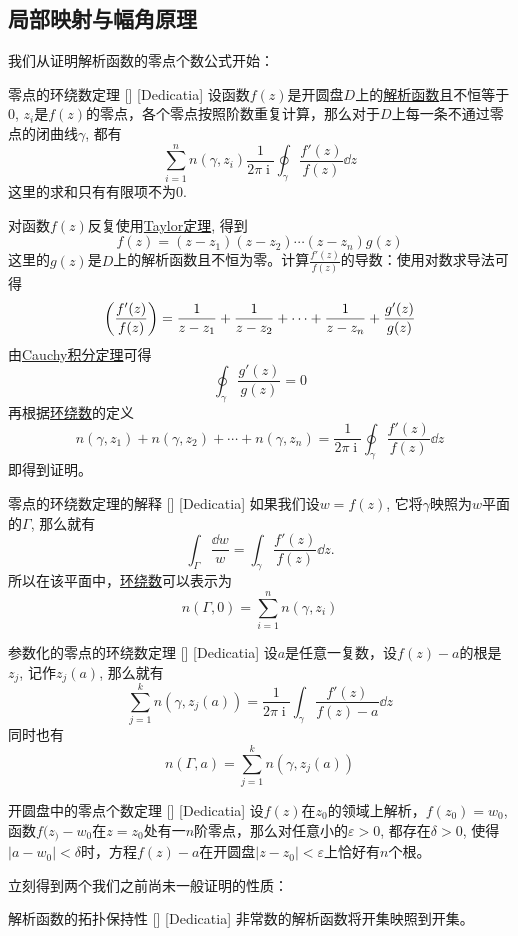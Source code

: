 \documentclass[UTF8]{ctexart}
\DeclareMathOperator{\ii}{\mathrm{i}}
\newcommand{\AnalyticalFunction}{\hyperref[dfn:AnalyticalFunction]{解析函数}}
\newcommand{\TaylorThm}{\hyperref[thm:Taylor]{Taylor定理}}
\newcommand{\CauchyThm}{\hyperref[thm:Cauchy]{Cauchy积分定理}}
\begin{document}
\subsection{局部映射与幅角原理}
我们从证明解析函数的零点个数公式开始：
\begin{thm}
    [UUID]
    {零点的环绕数定理}
    []
    [Dedicatia]
    设函数$f(z)$是开圆盘$D$上的\AnalyticalFunction 且不恒等于0, $z_i$是$f(z)$的零点，各个零点按照阶数重复计算，那么对于$D$上每一条不通过零点的闭曲线$\gamma$, 都有
    \[\sum_{i=1}^n n(\gamma, z_i)\frac{1}{2\pi\ii}\oint_\gamma\frac{f'(z)}{f(z)}\dd{z} \] 
    这里的求和只有有限项不为0.
\end{thm}
\begin{prf}
    对函数$f(z)$反复使用\TaylorThm , 得到
    \[f(z)=(z-z_1)(z-z_2)\cdots(z-z_n)g(z)\]
    这里的$g(z)$是$D$上的解析函数且不恒为零。计算$\frac{f'(z)}{f(z)}$的导数：使用对数求导法可得
    \[\pqty{\frac{f'(z)}{f(z)}}=\frac{1}{z-z_1}+\frac{1}{z-z_2}+\cdots+\frac{1}{z-z_n}+\frac{g'(z)}{g(z)}\]
    由\CauchyThm 可得
    \[\oint_\gamma\frac{g'(z)}{g(z)}=0 \]
    再根据\hyperref[dfn:WindingNumber]{环绕数}的定义
    \[n(\gamma,z_1)+n(\gamma,z_2)+\cdots+n(\gamma,z_n)=\frac{1}{2\pi\ii}\oint_\gamma \frac{f'(z)}{f(z)}\dd{z}\]
    即得到证明。
\end{prf}
\begin{crl}
    [UUID]
    {零点的环绕数定理的解释}
    []
    [Dedicatia]
    如果我们设$w=f(z)$, 它将$\gamma$映照为$w$平面的$\Gamma$, 那么就有
    \[\int_\Gamma\frac{\dd w}{w}=\int_\gamma \frac{f'(z)}{f(z)}\dd{z}.\]
    所以在该平面中，\hyperref[dfn:WindingNumber]{环绕数}可以表示为
    \[n(\Gamma,0)=\sum_{i=1}^n n(\gamma,z_i)\]
\end{crl}
\begin{crl}
    [UUID]
    {参数化的零点的环绕数定理}
    []
    [Dedicatia]
    设$a$是任意一复数，设$f(z)-a$的根是$z_j$, 记作$z_j(a)$, 那么就有
    \[\sum_{j=1}^{k}n(\gamma,z_j(a))=\frac{1}{2\pi\ii}\int_\gamma\frac{f'(z)}{f(z)-a}\dd{z}\]
    同时也有
    \[n(\Gamma,a)=\sum_{j=1}^k n(\gamma,z_j(a))\]
\end{crl}
\begin{thm}
    [UUID]
    {开圆盘中的零点个数定理}
    []
    [Dedicatia]
    设$f(z)$在$z_0$的领域上解析，$f(z_0)=w_0$, 函数$f(z_)-w_0$在$z=z_0$处有一$n$阶零点，那么对任意小的$\varepsilon>0$, 都存在$\delta>0$, 使得$|a-w_0|<\delta$时，方程$f(z)-a$在开圆盘$|z-z_0|<\varepsilon$上恰好有$n$个根。
\end{thm}
立刻得到两个我们之前尚未一般证明的性质：
\begin{crl}
    [UUID]
    {解析函数的拓扑保持性}
    []
    [Dedicatia]
    非常数的解析函数将开集映照到开集。
\end{crl}
\end{document}
